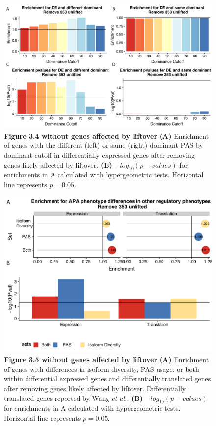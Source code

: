 \begin{figure}[!htb]
\centering
\includegraphics[width=5in]{img/ch03/Fig5-figSup1.pdf}
\caption[Figure 3.4 without genes affected by liftover]{\textbf{Figure 3.4 without genes affected by liftover} {\bf (A)}  Enrichment of genes with the different (left) or same (right) dominant PAS by dominant cutoff in differentially expressed genes after removing genes likely affected by liftover. {\bf (B)} $-log_{10}(p-values)$ for enrichments in A calculated with hypergeometric tests. Horizontal line represents $p= 0.05$.}
\label{fig:ch03-unliftfig5}
\end{figure}
\clearpage

\begin{figure}[!htb]
\centering
\includegraphics[width=5in]{img/ch03/Fig4-figSup3.pdf}
\caption[Figure 3.5 without genes affected by liftover]{\textbf{Figure 3.5 without genes affected by liftover} {\bf (A)} Enrichment of genes with differences in isoform diversity, PAS usage, or both within differential expressed genes and differentially translated genes after removing genes likely affected by liftover. Differentially translated genes reported by Wang \emph{et al.}\citep{wang_post-translational_2018}. {\bf (B)}  $-log_{10}(p-values)$ for enrichments in A calculated with hypergeometric tests. Horizontal line represents $p= 0.05$.}
\label{fig:ch03-unliftfig4}
\end{figure}
\clearpage


